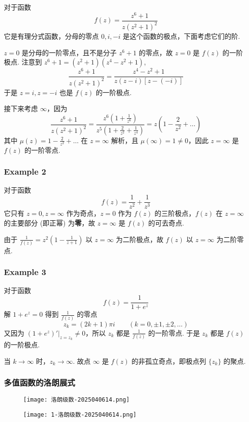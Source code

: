 对于函数
\[
f(z)=\frac{z^{6}+1}{z(z^2+1)^2}
\]
它是有理分式函数，分母的零点 $0,i,-i$ 是这个函数的极点，下面考虑它们的阶.

$z=0$ 是分母的一阶零点，且不是分子 $z^6+1$ 的零点，故 $z=0$ 是 $f(z)$ 的一阶极点. 注意到 $z^{6}+1=(z^2+1)(z^{4}-z^2+1)$,
\[
\frac{z^{6}+1}{z(z^2+1)^2}=\frac{z^{4}-z^2+1}{z(z-i)[z-(-i)]}
\]
于是 $z=i,z=-i$ 也是 $f(z)$ 的一阶极点.

接下来考虑 $\infty$，因为
\[
\frac{z^{6}+1}{z(z^2+1)^2}=\frac{z^{6}\left( 1+\frac{1}{z^{6}}  \right)}{z^{5}\left( 1+\frac{2}{z^2}+\frac{1}{z^{4}}  \right)}=z\left( 1-\frac{2}{z^{2}}+\dots \right)
\]
其中 $\mu(z)=1-\frac{2}{z^2}+\dots$ 在 $z=\infty$ 解析，且 $\mu(\infty)=1\neq0$，因此 $z=\infty$ 是 $f(z)$ 的一阶零点.

\subsubsection{Example 2}

对于函数
\[
f(z)=\frac{1}{z^2}+\frac{1}{z^3}
\]
它只有 $z=0,z=\infty$ 作为奇点，$z=0$ 作为 $f(z)$ 的三阶极点，$f(z)$ 在 $z=\infty$ 的主要部分 (即正幂) 为\textbf{零}，故 $z=\infty$ 是 $f(z)$ 的可去奇点.

由于 $\frac{1}{f(z)}=z^2\left( 1-\frac{1}{z+1} \right)$ 以 $z=\infty$ 为二阶极点，故 $f(z)$ 以 $z=\infty$ 为二阶零点.

\subsubsection{Example 3}

对于函数
\[
f(z)=\frac{1}{1+e^{ z }}
\]
解 $1+e^{ z }=0$ 得到 $\frac{1}{f(z)}$ 的零点
\[
z_k=(2k+1)\pi i \qquad (k=0,\pm1,\pm2,\dots)
\]
又因为 $\left.(1+e^{ z })'\right|_{z=z_k}\neq0$，所以 $z_k$ 都是 $\frac{1}{f(z)}$ 的一阶零点. 于是 $z_k$ 都是 $f(z)$ 的一阶极点.

当 $k\to \infty$ 时，$z_k\to \infty$. 故点 $\infty$ 是 $f(z)$ 的非孤立奇点，即极点列 $\{ z_k \}$ 的聚点.

\subsubsection{多值函数的洛朗展式}

\begin{figure}[H]
\centering
\texttt{[image: 洛朗级数-2025040614.png]}
\label{}
\end{figure}

\begin{figure}[H]
\centering
\texttt{[image: 1-洛朗级数-2025040614.png]}
\label{}
\end{figure}

